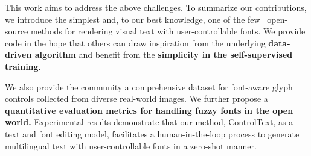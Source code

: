 This work aims to address the above challenges. To summarize our contributions, we introduce the simplest and, to our best knowledge, one of the few~\cite{ma2024glyphdraw2, liu2024glyph} open-source methods for rendering visual text with user-controllable fonts. 
We provide code in the hope that others can draw inspiration from the underlying \textbf{data-driven algorithm} and benefit from the \textbf{simplicity in the self-supervised training}.


We also provide the community a comprehensive dataset for font-aware glyph controls collected from diverse real-world images. We further propose a \textbf{quantitative evaluation metrics for handling fuzzy fonts in the open world.} Experimental results demonstrate that our method, ControlText, as a text and font editing model, facilitates a human-in-the-loop process to generate multilingual text with user-controllable fonts in a zero-shot manner.
